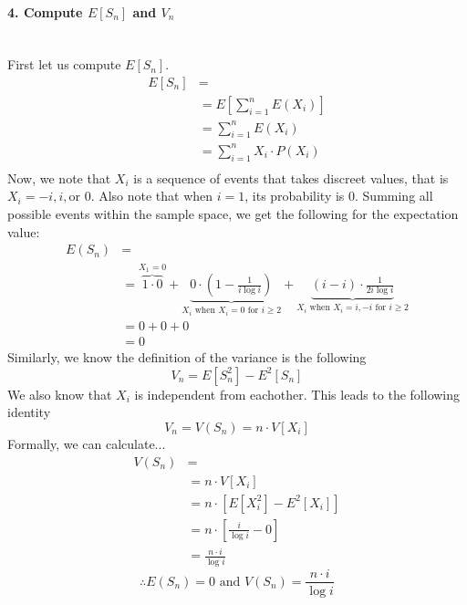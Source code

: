 \documentclass[11pt]{article}
\begin{document}
\paragraph{4. Compute $E[S_n]$ and $V_n$} \text{}\\
First let us compute $E[S_n]$. \\
\begin{align*}
    E[S_n] &= \\
    &= E \left[ \sum_{i=1} ^{n} E(X_i) \right] \\
    &= \sum_{i=1} ^{n} E(X_i) \\
    &= \sum_{i=1} ^{n} X_i \cdot P(X_i) \\
\end{align*}
Now, we note that $X_i$ is a sequence of events that takes discreet values, that is $X_i = -i, i, \text{or } 0$. Also note that when $i = 1$, its probability is $0$. Summing all possible events within the sample space, we get the following for the expectation value:
\begin{align*}
    E(S_n) &= \\
    &= \overbrace{1 \cdot 0}^{X_1 = 0} + \underbrace{0 \cdot \left(1 - \frac{1}{i \log i} \right)}_{X_i \text{ when } X_i = 0 \text{ for } i \ge 2} + \underbrace{(i - i) \cdot \frac{1}{2 i \log i}}_{X_i \text{ when } X_i = i, -i \text{ for } i \ge 2} \\
    & = 0 + 0 + 0 \\
    & = 0
\end{align*}
Similarly, we know the definition of the variance is the following
\begin{equation*}
    V_n = E[S_n^2] - E^2[S_n]
\end{equation*}
We also know that $X_i$ is independent from eachother. This leads to the following identity
\begin{equation*}
    V_n = V(S_n) = n \cdot V[X_i] 
\end{equation*}
Formally, we can calculate...
\begin{align*}
    V(S_n) &= \\
    &= n \cdot V[X_i] \\
    &= n \cdot \left[ E[X_i^2] - E^2[X_i] \right] \\
    &= n \cdot \left[\frac{i}{\log i} - 0 \right] \\
    &= \frac{n \cdot i}{\log i}
\end{align*}
\begin{equation*}
    \therefore \boxed{E(S_n) = 0 \text{ and } V(S_n) = \frac{n \cdot i}{\log i}}
\end{equation*}
\hline
\end{document}
